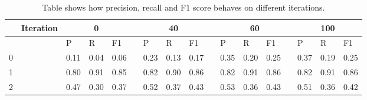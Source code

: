 \documentclass[10pt, a4paper]{article}
\begin{document}
\begin{table}[t!]
	\centering
	\caption{Table shows how precision, recall and F1 score behaves on different iterations.}
	\label{tbl:Scores}
	\begin{tabular}{|lllllllllllllll|l|l|}
		\hline
		& Iteration             & \multicolumn{3}{c}{0}                                                             &                       & \multicolumn{3}{c}{40}                                                            &                       & \multicolumn{4}{c}{60}                                                                                    & \multicolumn{3}{c|}{100} \\ \hline
		\multicolumn{1}{|l|}{}  & \multicolumn{1}{l|}{} & \multicolumn{1}{l|}{P}    & \multicolumn{1}{l|}{R}    & \multicolumn{1}{l|}{F1}   & \multicolumn{1}{l|}{} & \multicolumn{1}{l|}{P}    & \multicolumn{1}{l|}{R}    & \multicolumn{1}{l|}{F1}   & \multicolumn{1}{l|}{} & \multicolumn{1}{l|}{P}    & \multicolumn{1}{l|}{R}    & \multicolumn{1}{l|}{F1}   & \multicolumn{1}{l|}{} & P      & R      & F1     \\ \hline
		\multicolumn{1}{|l|}{0} & \multicolumn{1}{l|}{} & \multicolumn{1}{l|}{0.11} & \multicolumn{1}{l|}{0.04} & \multicolumn{1}{l|}{0.06} & \multicolumn{1}{l|}{} & \multicolumn{1}{l|}{0.23} & \multicolumn{1}{l|}{0.13} & \multicolumn{1}{l|}{0.17} & \multicolumn{1}{l|}{} & \multicolumn{1}{l|}{0.35} & \multicolumn{1}{l|}{0.20} & \multicolumn{1}{l|}{0.25} & \multicolumn{1}{l|}{} & 0.37   & 0.19   & 0.25   \\ \hline
		\multicolumn{1}{|l|}{1} & \multicolumn{1}{l|}{} & \multicolumn{1}{l|}{0.80} & \multicolumn{1}{l|}{0.91} & \multicolumn{1}{l|}{0.85} & \multicolumn{1}{l|}{} & \multicolumn{1}{l|}{0.82} & \multicolumn{1}{l|}{0.90} & \multicolumn{1}{l|}{0.86} & \multicolumn{1}{l|}{} & \multicolumn{1}{l|}{0.82} & \multicolumn{1}{l|}{0.91} & \multicolumn{1}{l|}{0.86} & \multicolumn{1}{l|}{} & 0.82   & 0.91   & 0.86   \\ \hline
		\multicolumn{1}{|l|}{2} & \multicolumn{1}{l|}{} & \multicolumn{1}{l|}{0.47} & \multicolumn{1}{l|}{0.30} & \multicolumn{1}{l|}{0.37} & \multicolumn{1}{l|}{} & \multicolumn{1}{l|}{0.52} & \multicolumn{1}{l|}{0.37} & \multicolumn{1}{l|}{0.43} & \multicolumn{1}{l|}{} & \multicolumn{1}{l|}{0.53} & \multicolumn{1}{l|}{0.36} & \multicolumn{1}{l|}{0.43} & \multicolumn{1}{l|}{} & 0.51   & 0.36   & 0.42   \\ \hline
	\end{tabular}
\end{table}
\end{document}
